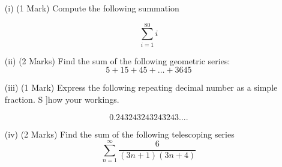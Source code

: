 \documentclass[11pt]{article} %
\begin{document}
\begin{enumerate}
	\item[(i)](1 Mark)  Compute the following summation
	
	\[ \sum_{i=1}^{80} i \]

	\vspace{5.5cm}
	\item[(ii)] (2 Marks) Find the sum of the following geometric series: 
		\[5 + 15 + 45 +  \ldots + 3645\]
		\newpage

	
	\item[(iii)] (1 Mark) Express the following repeating decimal number as a simple fraction. S
	]how your workings.
	
	\[0.243243243243243....\]
	\vspace{5.5cm}
	\item[(iv)] (2 Marks) Find the sum of the following telescoping series
		\[  \sum^{\infty}_{n=1}   \frac{6}{(3n+1)(3n+4)}  \]
		
\end{enumerate}
\end{document}
